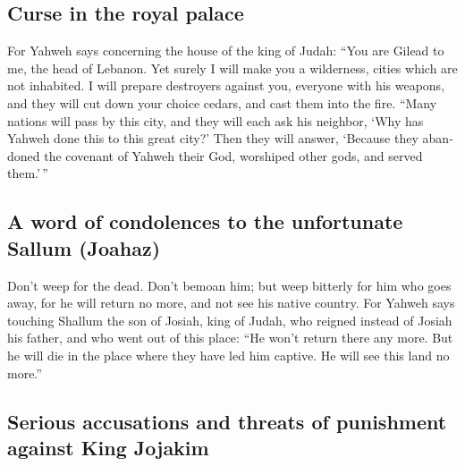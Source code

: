 \begin{paracol}{2}
\begin{otherlanguage}{english}
\hypertarget{curse-in-the-royal-palace}{%
\subsection{Curse in the royal palace}\label{curse-in-the-royal-palace}}

 For Yahweh says concerning the house of the king of
Judah: ``You are Gilead to me, the head of Lebanon. Yet surely I will
make you a wilderness, cities which are not inhabited.  I
will prepare destroyers against you, everyone with his weapons, and they
will cut down your choice cedars, and cast them into the fire.
 ``Many nations will pass by this city, and they will each
ask his neighbor, `Why has Yahweh done this to this great city?'
 Then they will answer, `Because they abandoned the
covenant of Yahweh their God, worshiped other gods, and served
them.'\,''

\hypertarget{a-word-of-condolences-to-the-unfortunate-sallum-joahaz}{%
\subsection{A word of condolences to the unfortunate Sallum
(Joahaz)}\label{a-word-of-condolences-to-the-unfortunate-sallum-joahaz}}

 Don't weep for the dead. Don't bemoan him; but weep
bitterly for him who goes away, for he will return no more, and not see
his native country.  For Yahweh says touching Shallum the
son of Josiah, king of Judah, who reigned instead of Josiah his father,
and who went out of this place: ``He won't return there any more.
 But he will die in the place where they have led him
captive. He will see this land no more.''

\hypertarget{serious-accusations-and-threats-of-punishment-against-king-jojakim}{%
\subsection{Serious accusations and threats of punishment against King
Jojakim}\label{serious-accusations-and-threats-of-punishment-against-king-jojakim}}


\end{otherlanguage}
\end{paracol}
